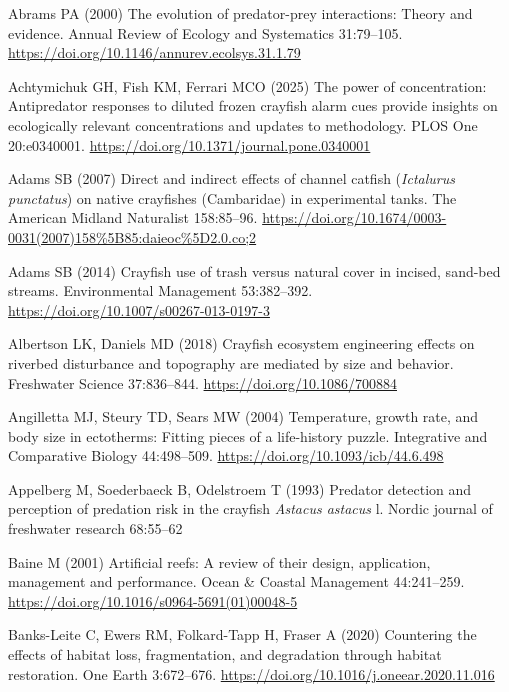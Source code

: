 \documentclass[
  12pt,
  a4paper,
  oneside]{scrbook}
\newlength{\cslhangindent}
\newenvironment{CSLReferences}[2] %
 {\begin{list}{}{%
  \setlength{\itemindent}{0pt}
  \setlength{\leftmargin}{0pt}
  \setlength{\parsep}{0pt}
  \ifodd #1
   \setlength{\leftmargin}{\cslhangindent}
   \setlength{\itemindent}{-1\cslhangindent}
  \fi
  \setlength{\itemsep}{#2\baselineskip}}}
 {\end{list}}
\renewenvironment{CSLReferences}[2]
   {\begin{list}{}{%
    \setlength{\itemindent}{0pt}
    \setlength{\leftmargin}{0pt}
    \setlength{\parsep}{0pt}
    \ifodd #1
     \setlength{\leftmargin}{\cslhangindent}
     \setlength{\itemindent}{-1\cslhangindent}
    \fi
    \setlength{\itemsep}{0.3\baselineskip}}}
   {\end{list}}%
\begin{document}
\protect{}\label{refs}
\begin{CSLReferences}{1}{1}
Abrams PA (2000) The evolution of predator-prey interactions: Theory and
evidence. Annual Review of Ecology and Systematics 31:79--105.
\url{https://doi.org/10.1146/annurev.ecolsys.31.1.79}

Achtymichuk GH, Fish KM, Ferrari MCO (2025) The power of concentration:
Antipredator responses to diluted frozen crayfish alarm cues provide
insights on ecologically relevant concentrations and updates to
methodology. PLOS One 20:e0340001.
\url{https://doi.org/10.1371/journal.pone.0340001}

Adams SB (2007) Direct and indirect effects of channel catfish
({\emph{Ictalurus punctatus}}) on native crayfishes ({Cambaridae}) in
experimental tanks. The American Midland Naturalist 158:85--96.
\url{https://doi.org/10.1674/0003-0031(2007)158\%5B85:daieoc\%5D2.0.co;2}

Adams SB (2014) Crayfish use of trash versus natural cover in incised,
sand-bed streams. Environmental Management 53:382--392.
\url{https://doi.org/10.1007/s00267-013-0197-3}

Albertson LK, Daniels MD (2018) Crayfish ecosystem engineering effects
on riverbed disturbance and topography are mediated by size and
behavior. Freshwater Science 37:836--844.
\url{https://doi.org/10.1086/700884}

Angilletta MJ, Steury TD, Sears MW (2004) Temperature, growth rate, and
body size in ectotherms: Fitting pieces of a life-history puzzle.
Integrative and Comparative Biology 44:498--509.
\url{https://doi.org/10.1093/icb/44.6.498}

Appelberg M, Soederbaeck B, Odelstroem T (1993) Predator detection and
perception of predation risk in the crayfish {\emph{Astacus astacus}} l.
Nordic journal of freshwater research 68:55--62

Baine M (2001) Artificial reefs: A review of their design, application,
management and performance. Ocean \& Coastal Management 44:241--259.
\url{https://doi.org/10.1016/s0964-5691(01)00048-5}

Banks-Leite C, Ewers RM, Folkard-Tapp H, Fraser A (2020) Countering the
effects of habitat loss, fragmentation, and degradation through habitat
restoration. One Earth 3:672--676.
\url{https://doi.org/10.1016/j.oneear.2020.11.016}


\end{CSLReferences}
\end{document}
